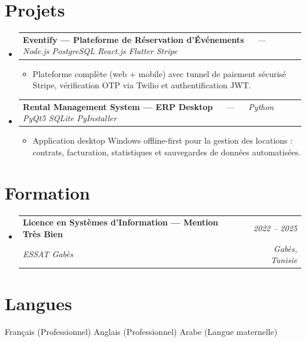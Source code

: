 \documentclass[letterpaper,9pt]{article}
\makeatletter
\newcommand{\resumeItem}[1]{\item\small{#1}}
\newcommand{\resumeSubheading}[4]{
  \vspace{-1pt}\item
  \begin{tabular*}{0.97\textwidth}[t]{l@{\extracolsep{\fill}}r}
    \textbf{#1} & \textit{\color{greytext}#2} \\
    \textit{\small\color{greytext} #3} & \textit{\small\color{greytext} #4}
  \end{tabular*}\vspace{-2pt}
}
\newcommand{\resumeProjectHeading}[2]{
  \item
  \begin{tabular*}{0.97\textwidth}{l@{\extracolsep{\fill}}r}
    \small #1 & #2
  \end{tabular*}\vspace{-1pt}
}
\newcommand{\resumeSubHeadingListStart}{\begin{itemize}[leftmargin=0.18in, label={}, itemsep=1.2pt, topsep=2.5pt, parsep=0pt]}
\newcommand{\resumeSubHeadingListEnd}{\end{itemize}\vspace{-2pt}}
\newcommand{\resumeProjectListStart}{\begin{itemize}[leftmargin=0.24in, label={}, itemsep=0.9pt, topsep=1.2pt, parsep=0pt]}
\newcommand{\resumeProjectListEnd}{\end{itemize}\vspace{-2pt}}
\makeatother
\begin{document}
\section{Projets}
\resumeSubHeadingListStart

  \resumeProjectHeading{\textbf{Eventify --- Plateforme de Réservation d'Événements} $\quad$ --- $\quad$ \emph{\color{greytext}Node.js \textperiodcentered{} PostgreSQL \textperiodcentered{} React.js \textperiodcentered{} Flutter \textperiodcentered{} Stripe}}{}
    \resumeProjectListStart
      \resumeItem{Plateforme complète (web + mobile) avec tunnel de paiement sécurisé Stripe, vérification OTP via Twilio et authentification JWT.}
    \resumeProjectListEnd

  \resumeProjectHeading{\textbf{Rental Management System --- ERP Desktop} $\quad$ --- $\quad$ \emph{\color{greytext}Python \textperiodcentered{} PyQt5 \textperiodcentered{} SQLite \textperiodcentered{} PyInstaller}}{}
    \resumeProjectListStart
      \resumeItem{Application desktop Windows offline-first pour la gestion des locations : contrats, facturation, statistiques et sauvegardes de données automatisées.}
    \resumeProjectListEnd

\resumeSubHeadingListEnd\vspace{-3pt}

\section{Formation}
\resumeSubHeadingListStart
  \resumeSubheading{Licence en Systèmes d'Information --- Mention Très Bien}{2022 -- 2025}{ESSAT Gabès}{Gabès, Tunisie}
\resumeSubHeadingListEnd\vspace{-1pt}

\section{Langues}
\begin{itemize}[leftmargin=0.18in, label={}, topsep=2pt, itemsep=1pt, parsep=0pt]
\footnotesize{
  \item Français (Professionnel) \textperiodcentered{} Anglais (Professionnel) \textperiodcentered{} Arabe (Langue maternelle)
}
\end{itemize}
\end{document}
